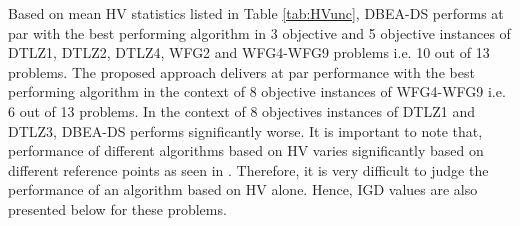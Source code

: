 \documentclass[conference]{IEEEtran}
\begin{document}
 Based on mean HV statistics listed in Table \ref{tab:HVunc}, DBEA-DS performs at par with the best performing algorithm in 3 objective and 5 objective instances of DTLZ1, DTLZ2, DTLZ4, WFG2 and WFG4-WFG9 problems i.e. 10 out of 13 problems. The proposed approach delivers at par performance with the best performing algorithm in the context of 8 objective instances of WFG4-WFG9 i.e. 6 out of 13 problems. In the context of 8 objectives instances of DTLZ1 and DTLZ3, DBEA-DS performs significantly worse. It is important to note that, performance of different algorithms based on HV varies significantly based on different reference points as seen in \cite{ishibuchi2016inverse}. Therefore, it is very difficult to judge the performance of an algorithm based on HV alone. Hence, IGD values are also presented below for these problems. 
\end{document}
